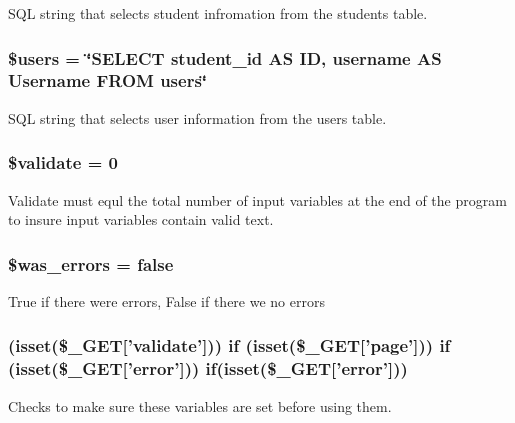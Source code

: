 \-S\-Q\-L string that selects student infromation from the students table. \hypertarget{settings_8php_a28005d22fa7ef2dfe215ad886b497d9c}{
\subsubsection[{\$users}]{\setlength{\rightskip}{0pt plus 5cm}\$users = \char`\"{}\-S\-E\-L\-E\-C\-T student\-\_\-id \-A\-S \-I\-D, username \-A\-S \-Username \-F\-R\-O\-M users\char`\"{}}}\label{settings_8php_a28005d22fa7ef2dfe215ad886b497d9c}
\-S\-Q\-L string that selects user information from the users table. \hypertarget{settings_8php_a320b75b46e1832c327d9d47b4cea9e7d}{
\subsubsection[{\$validate}]{\setlength{\rightskip}{0pt plus 5cm}\$validate = 0}}\label{settings_8php_a320b75b46e1832c327d9d47b4cea9e7d}
\-Validate must equl the total number of input variables at the end of the program to insure input variables contain valid text. \hypertarget{settings_8php_ae8f928f475945454d3cfd1d4214c09f2}{
\subsubsection[{\$was\-\_\-errors}]{\setlength{\rightskip}{0pt plus 5cm}\$was\-\_\-errors = false}}\label{settings_8php_ae8f928f475945454d3cfd1d4214c09f2}
\-True if there were errors, \-False if there we no errors \hypertarget{settings_8php_a0ed21aab8454e9342adc3df6d89ac9fe}{
\subsubsection[{if}]{ (isset(\$\-\_\-\-G\-E\-T\mbox{[}'validate'\mbox{]})) {\bf if} (isset(\$\-\_\-\-G\-E\-T\mbox{[}'page'\mbox{]})) {\bf if} (isset(\$\-\_\-\-G\-E\-T\mbox{[}'error'\mbox{]})) {\bf if}(isset(\$\-\_\-\-G\-E\-T\mbox{[}'error'\mbox{]}))}}\label{settings_8php_a0ed21aab8454e9342adc3df6d89ac9fe}
\-Checks to make sure these variables are set before using them. 